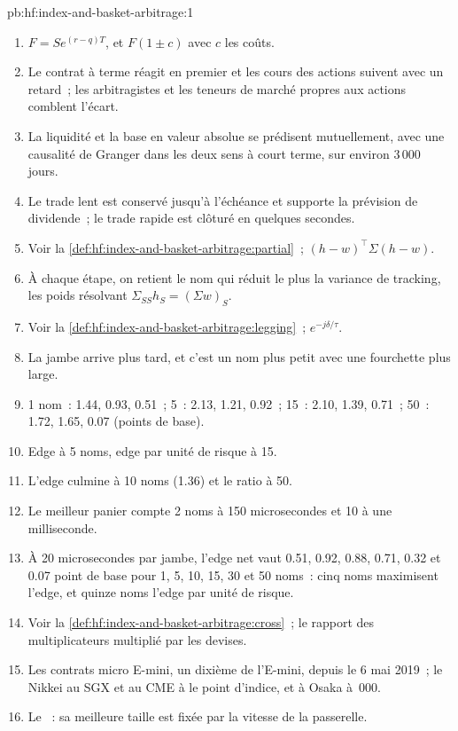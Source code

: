 \begin{solution}{pb:hf:index-and-basket-arbitrage:1}
\begin{enumerate}
\item $F=Se^{(r-q)T}$, et $F(1\pm c)$ avec $c$ les coûts.
\item Le contrat à terme réagit en premier et les cours des actions suivent avec un retard~; les arbitragistes et les teneurs de marché propres aux actions comblent l'écart.
\item La liquidité et la base en valeur absolue se prédisent mutuellement, avec une causalité de Granger dans les deux sens à court terme, sur environ 3\,000 jours.
\item Le trade lent est conservé jusqu'à l'échéance et supporte la prévision de dividende~; le trade rapide est clôturé en quelques secondes.
\item Voir la \cref{def:hf:index-and-basket-arbitrage:partial}~; $(h-w)^\top\Sigma(h-w)$.
\item À chaque étape, on retient le nom qui réduit le plus la variance de tracking, les poids résolvant $\Sigma_{SS}h_S=(\Sigma w)_S$.
\item Voir la \cref{def:hf:index-and-basket-arbitrage:legging}~; $e^{-j\delta/\tau}$.
\item La jambe arrive plus tard, et c'est un nom plus petit avec une fourchette plus large.
\item 1 nom~: 1.44, 0.93, 0.51~; 5~: 2.13, 1.21, 0.92~; 15~: 2.10, 1.39, 0.71~; 50~: 1.72, 1.65, 0.07 (points de base).
\item Edge à 5 noms, edge par unité de risque à 15.
\item L'edge culmine à 10 noms (1.36) et le ratio à 50.
\item Le meilleur panier compte 2 noms à 150 microsecondes et 10 à une milliseconde.
\item À 20 microsecondes par jambe, l'edge net vaut 0.51, 0.92, 0.88, 0.71, 0.32 et 0.07 point de base pour 1, 5, 10, 15, 30 et 50 noms~: cinq noms maximisent
l'edge, et quinze noms l'edge par unité de risque.
\item Voir la \cref{def:hf:index-and-basket-arbitrage:cross}~; le rapport des multiplicateurs multiplié par les devises.
\item Les contrats micro E-mini, un dixième de l'E-mini, depuis le 6 mai 2019~; le Nikkei au SGX et au CME à  le point d'indice, et à Osaka à \,000.
\item Le ~: sa meilleure taille est fixée par la vitesse de la passerelle.

\end{enumerate}
\end{solution}
